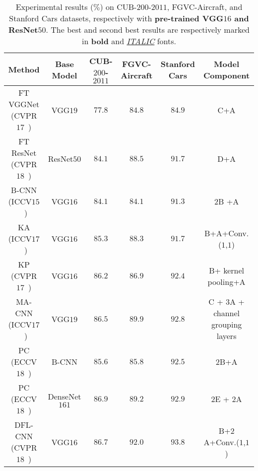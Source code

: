 \documentclass[journal]{IEEEtran}
\begin{document}
\begin{table*}[!t]
  \centering
  \footnotesize
  \caption{Experimental results ($\%$) on CUB-$200$-$2011$, FGVC-Aircraft, and Stanford Cars datasets, respectively with \textbf{pre-trained VGG$16$ and ResNet$50$}. The best and second best results are respectively marked in \textbf{bold} and \underline{\emph{ITALIC}} fonts.}
    \begin{tabular}{|c|c|c|c|c|c|}
    \hline
    Method                                       & Base Model     & CUB-$200$-$2011$              & FGVC-Aircraft                 & Stanford Cars    & Model Component \\
    \hline
    \hline
    FT VGGNet (CVPR$17$~\cite{wang2018learning}) & VGG$19$                    & $77.8$                        & $84.8$                        & $84.9$            & C+A \\
    FT ResNet (CVPR$18$~\cite{wang2018learning}) & ResNet$50$                 & $84.1$                        & $88.5$                        & $91.7$            & D+A \\
    B-CNN (ICCV$15$~\cite{lin2015bilinear})      & VGG$16$                    & $84.1$                        & $84.1$                        & $91.3$            & $2$B +A \\
    KA (ICCV$17$~\cite{cai2017higher})           & VGG$16$                    & $85.3$                        & $88.3$                        & $91.7$            & B+A+Conv.($1$,$1$) \\
    KP (CVPR$17$~\cite{cui2017kernel})           & VGG$16$                    & $86.2$                        & $86.9$                        & $92.4$            & B+ kernel pooling+A \\
    MA-CNN (ICCV$17$~\cite{zheng2017learning})   & VGG$19$                    & $86.5$                        & $89.9$                        & $92.8$            & C + $3$A + channel grouping layers \\
    PC (ECCV$18$~\cite{dubey2018pairwise})       & B-CNN                      & $85.6$                        & $85.8$                        & $92.5$            & $2$B+A \\
    PC (ECCV$18$~\cite{dubey2018pairwise})       & DenseNet$161$              & $86.9$                        & $89.2$                        & $92.9$            & $2$E + $2$A \\
    DFL-CNN (CVPR$18$~\cite{wang2018learning})   & VGG$16$                    & $86.7$                        & $92.0$                        & $93.8$            & B+$2$A+Conv.($1$,$1$) \\

\end{tabular}
\end{table*}
\end{document}
